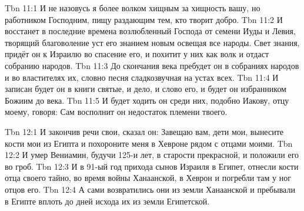 \vs Tbn 11:1
И не назовусь я более волком хищным за хищность вашу,
но работником Господним, пищу раздающим тем, кто творит добро.
\vs Tbn 11:2
И восстанет в последние времена возлюбленный Господа от семени Иуды и Левия,
творящий благоволение уст его знанием новым освещая все народы.
Свет знания, придёт он к Израилю во спасение его,
и похитит у них как волк и отдаст собранию народов.
\vs Tbn 11:3
До скончания века пребудет он в собраниях народов и во властителях их,
словно песня сладкозвучная на устах всех.
\vs Tbn 11:4
И записан будет он в книги святые, и дело, и слово его,
и будет он избранником Божиим до века.
\vs Tbn 11:5
И будет ходить он среди них, подобно Иакову, отцу моему, говоря:
Сам восполнит он недостаток племени твоего.

\vs Tbn 12:1
И закончив речи свои, сказал он: Завещаю вам, дети мои,
вынесите кости мои из Египта и похороните меня в Хевроне рядом с отцами моими.
\vs Tbn 12:2
И умер Вениамин, будучи 125-и лет, в старости прекрасной,
и положили его во гроб.
\vs Tbn 12:3
И в 91-ый год прихода сынов Израиля в Египет,
отнесли кости отца своего тайно,
во время войны Ханаанской, в Хеврон и погребли там у ног отцов его.
\vs Tbn 12:4
А сами возвратились они из земли Ханаанской
и пребывали в Египте вплоть до дней исхода их из земли Египетской.
